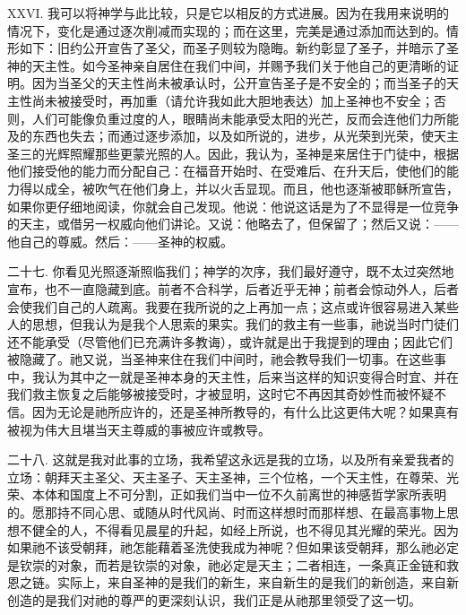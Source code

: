 XXVI. 我可以将神学与此比较，只是它以相反的方式进展。因为在我用来说明的情况下，变化是通过逐次削减而实现的；而在这里，完美是通过添加而达到的。情形如下：旧约公开宣告了圣父，而圣子则较为隐晦。新约彰显了圣子，并暗示了圣神的天主性。如今圣神亲自居住在我们中间，并赐予我们关于他自己的更清晰的证明。因为当圣父的天主性尚未被承认时，公开宣告圣子是不安全的；而当圣子的天主性尚未被接受时，再加重（请允许我如此大胆地表达）加上圣神也不安全；否则，人们可能像负重过度的人，眼睛尚未能承受太阳的光芒，反而会连他们力所能及的东西也失去；而通过逐步添加，以及如所说的，进步，从光荣到光荣，使天主圣三的光辉照耀那些更蒙光照的人。因此，我认为，圣神是来居住于门徒中，根据他们接受他的能力而分配自己：在福音开始时、在受难后、在升天后，使他们的能力得以成全，被吹气在他们身上，并以火舌显现。而且，他也逐渐被耶稣所宣告，如果你更仔细地阅读，你就会自己发现。他说：他说这话是为了不显得是一位竞争的天主，或借另一权威向他们讲论。又说：他略去了，但保留了；然后又说：——他自己的尊威。然后：——圣神的权威。\par

二十七. 你看见光照逐渐照临我们；神学的次序，我们最好遵守，既不太过突然地宣布，也不一直隐藏到底。前者不合科学，后者近乎无神；前者会惊动外人，后者会使我们自己的人疏离。我要在我所说的之上再加一点；这点或许很容易进入某些人的思想，但我认为是我个人思索的果实。我们的救主有一些事，祂说当时门徒们还不能承受（尽管他们已充满许多教诲），或许就是出于我提到的理由；因此它们被隐藏了。祂又说，当圣神来住在我们中间时，祂会教导我们一切事。在这些事中，我认为其中之一就是圣神本身的天主性，后来当这样的知识变得合时宜、并在我们救主恢复之后能够被接受时，才被显明，这时它不再因其奇妙性而被怀疑不信。因为无论是祂所应许的，还是圣神所教导的，有什么比这更伟大呢？如果真有被视为伟大且堪当天主尊威的事被应许或教导。\par

二十八. 这就是我对此事的立场，我希望这永远是我的立场，以及所有亲爱我者的立场：朝拜天主圣父、天主圣子、天主圣神，三个位格，一个天主性，在尊荣、光荣、本体和国度上不可分割，正如我们当中一位不久前离世的神感哲学家所表明的。愿那持不同心思、或随从时代风尚、时而这样想时而那样想、在最高事物上思想不健全的人，不得看见晨星的升起，如经上所说，也不得见其光耀的荣光。因为如果祂不该受朝拜，祂怎能藉着圣洗使我成为神呢？但如果该受朝拜，那么祂必定是钦崇的对象，而若是钦崇的对象，祂必定是天主；二者相连，一条真正金链和救恩之链。实际上，来自圣神的是我们的新生，来自新生的是我们的新创造，来自新创造的是我们对祂的尊严的更深刻认识，我们正是从祂那里领受了这一切。\par

